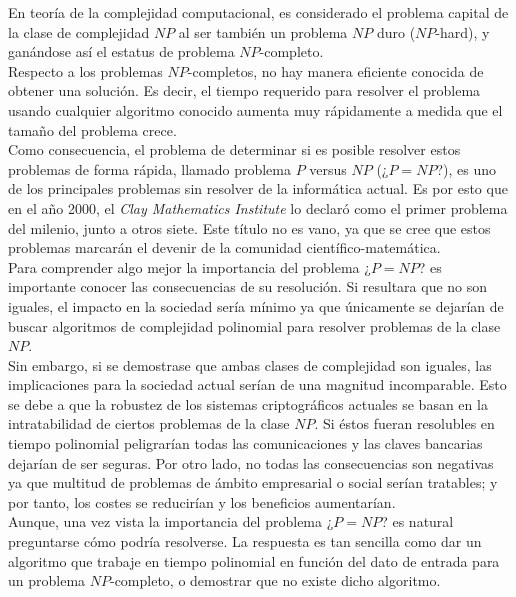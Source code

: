 En teoría de la complejidad computacional, es considerado el problema capital de la clase de complejidad $NP$ al ser también un problema $NP$ duro ($NP$-hard), y ganándose así el estatus de problema $NP$-completo. \\

Respecto a los problemas $NP$-completos, no hay manera eficiente conocida de obtener una solución. Es decir, el tiempo requerido para resolver el problema usando cualquier algoritmo conocido aumenta muy rápidamente a medida que el tamaño del problema crece.\\

Como consecuencia, el problema de determinar si es posible resolver estos problemas de forma rápida, llamado problema $P$ versus $NP$ (¿$P=NP$?), es uno de los principales problemas sin resolver de la informática actual. Es por esto que en el año 2000, el \textit{Clay Mathematics Institute} lo declaró como el primer problema del milenio, junto a otros siete. Este título no es vano, ya que se cree que estos problemas marcarán el devenir de la comunidad científico-matemática.\\

Para comprender algo mejor la importancia del problema ¿$P=NP$? es importante conocer las consecuencias de su resolución. Si resultara que no son iguales, el impacto en la sociedad sería mínimo ya que únicamente se dejarían de buscar algoritmos de complejidad polinomial para resolver problemas de la clase $NP$.\\

Sin embargo, si se demostrase que ambas clases de complejidad son iguales, las implicaciones para la sociedad actual serían de una magnitud incomparable. Esto se debe a que la robustez de los sistemas criptográficos actuales se basan en la intratabilidad de ciertos problemas de la clase $NP$. Si éstos fueran resolubles en tiempo polinomial peligrarían todas las comunicaciones y las claves bancarias dejarían de ser seguras. Por otro lado, no todas las consecuencias son negativas ya que multitud de problemas de ámbito empresarial o social serían tratables; y por tanto, los costes se reducirían y los beneficios aumentarían.\\

Aunque, una vez vista la importancia del problema ¿$P=NP$? es natural preguntarse cómo podría resolverse. La respuesta es tan sencilla como dar un algoritmo que trabaje en tiempo polinomial en función del dato de entrada para un problema $NP$-completo, o demostrar que no existe dicho algoritmo. \\ 

